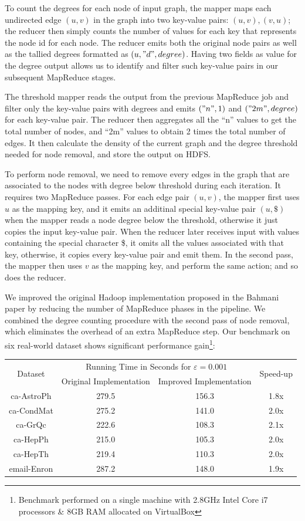 \documentclass{article}
\begin{document}
To count the degrees for each node of input graph, the mapper maps each undirected edge $(u,v)$ in the graph into two key-value pairs: $(u, v), (v, u)$; the reducer then simply counts the number of values for each key that represents the node id for each node. The reducer emits both the original node pairs as well as the tallied degrees formatted as $(u, "d", degree)$. Having two fields as value for the degree output allows us to identify and filter such key-value pairs in our subsequent MapReduce stages.

The threshold mapper reads the output from the previous MapReduce job and filter only the key-value pairs with degrees and emits $("n", 1)$ and $("2m", degree)$ for each key-value pair. The reducer then aggregates all the ``n'' values to get the total number of nodes, and ``2m'' values to obtain 2 times the total number of edges. It then calculate the density of the current graph and the degree threshold needed for node removal, and store the output on HDFS.

To perform node removal, we need to remove every edges in the graph that are associated to the nodes with degree below threshold during each iteration. It requires two MapReduce passes. For each edge pair $(u,v)$, the mapper first uses $u$ as the mapping key, and it emits an additinal special key-value pair $(u, \$)$ when the mapper reads a node degree below the threshold, otherwise it just copies the input key-value pair. When the reducer later receives input with values containing the special character \$, it omits all the values associated with that key, otherwise, it copies every key-value pair and emit them. In the second pass, the mapper then uses $v$ as the mapping key, and perform the same action; and so does the reducer.

We improved the original Hadoop implementation proposed in the Bahmani paper by reducing the number of MapReduce phases in the pipeline. We combined the degree counting procedure with the second pass of node removal, which eliminates the overhead of an extra MapReduce step. Our benchmark on six real-world dataset shows significant performance gain\footnote{Benchmark performed on a single machine with 2.8GHz Intel Core i7 processors \& 8GB RAM allocated on VirtualBox}:

\begin{tabular}{|c|c|c|c|}
\hline
\multirow{2}{*}{ Dataset } & \multicolumn{2}{|c|}{ Running Time in Seconds for $\varepsilon=0.001$ } & \multirow{2}{*}{ Speed-up } \\
& Original Implementation  & Improved Implementation & \\
\hline
ca-AstroPh & 279.5 & 156.3 & 1.8x \\
ca-CondMat & 275.2 & 141.0 & 2.0x \\
ca-GrQc & 222.6 & 108.3 & 2.1x \\
ca-HepPh & 215.0 & 105.3 & 2.0x \\
ca-HepTh & 219.4 & 110.3 & 2.0x \\
email-Enron & 287.2 & 148.0 & 1.9x \\
\hline
\end{tabular}
\end{document}
